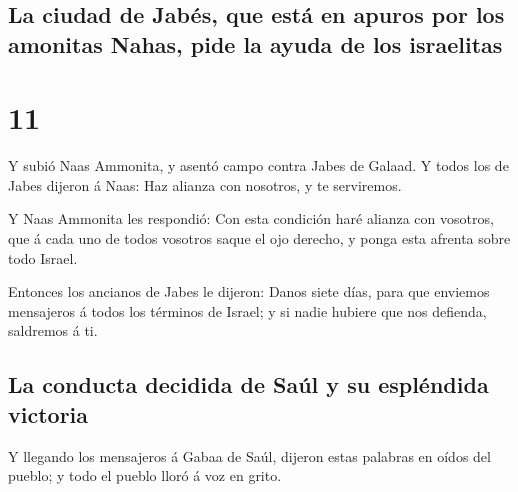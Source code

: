 \hypertarget{la-ciudad-de-jabuxe9s-que-estuxe1-en-apuros-por-los-amonitas-nahas-pide-la-ayuda-de-los-israelitas}{%
\subsection{La ciudad de Jabés, que está en apuros por los amonitas
Nahas, pide la ayuda de los
israelitas}\label{la-ciudad-de-jabuxe9s-que-estuxe1-en-apuros-por-los-amonitas-nahas-pide-la-ayuda-de-los-israelitas}}

\hypertarget{section-09-11}{%
\section{11}\label{section-09-11}}

 Y subió Naas Ammonita, y asentó campo contra Jabes de
Galaad. Y todos los de Jabes dijeron á Naas: Haz alianza con nosotros, y
te serviremos.

 Y Naas Ammonita les respondió: Con esta condición haré
alianza con vosotros, que á cada uno de todos vosotros saque el ojo
derecho, y ponga esta afrenta sobre todo Israel.

 Entonces los ancianos de Jabes le dijeron: Danos siete
días, para que enviemos mensajeros á todos los términos de Israel; y si
nadie hubiere que nos defienda, saldremos á ti.

\hypertarget{la-conducta-decidida-de-sauxfal-y-su-espluxe9ndida-victoria}{%
\subsection{La conducta decidida de Saúl y su espléndida
victoria}\label{la-conducta-decidida-de-sauxfal-y-su-espluxe9ndida-victoria}}

 Y llegando los mensajeros á Gabaa de Saúl, dijeron estas
palabras en oídos del pueblo; y todo el pueblo lloró á voz en grito.

